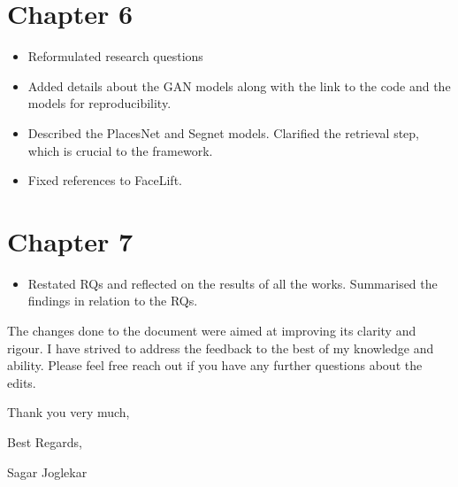 \documentclass[11pt,a4paper,roman]{moderncv}
\begin{document}
\section{Chapter 6}

\begin{itemize}
    \item Reformulated research questions
    \item Added details about the GAN models along with the link to the code and the models for reproducibility. 
    \item Described the PlacesNet and Segnet models. Clarified the retrieval step, which is crucial to the framework.
    \item Fixed references to FaceLift. 
\end{itemize}

\section{Chapter 7}
\begin{itemize}
    \item Restated RQs and reflected on the results of all the works. Summarised the findings in relation to the RQs.
\end{itemize}


\vspace{20mm}
The changes done to the document were aimed at improving its clarity and rigour. I have strived to address the feedback to the best of my knowledge and ability. 
Please feel free reach out if you have any further questions about the edits. 

Thank you very much, 

Best Regards,

Sagar Joglekar
\end{document}
